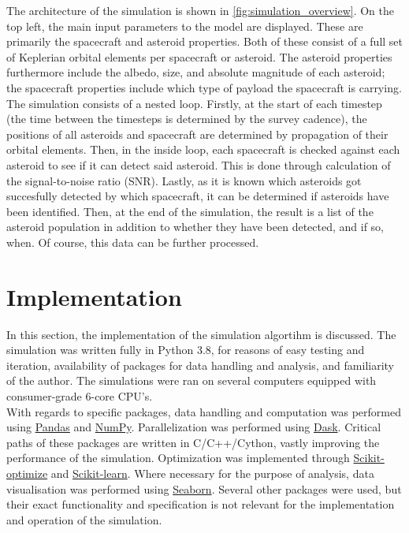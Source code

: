 The architecture of the simulation is shown in \autoref{fig:simulation_overview}. On the top left, the main input parameters to the model are displayed. These are primarily the spacecraft and asteroid properties. Both of these consist of a full set of Keplerian orbital elements per spacecraft or asteroid. The asteroid properties furthermore include the albedo, size, and absolute magnitude of each asteroid; the spacecraft properties include which type of payload the spacecraft is carrying. \\

The simulation consists of a nested loop. Firstly, at the start of each timestep (the time between the timesteps is determined by the survey cadence), the positions of all asteroids and spacecraft are determined by propagation of their orbital elements. Then, in the inside loop, each spacecraft is checked against each asteroid to see if it can detect said asteroid. This is done through calculation of the signal-to-noise ratio (SNR). Lastly, as it is known which asteroids got succesfully detected by which spacecraft, it can be determined if asteroids have been identified. Then, at the end of the simulation, the result is a list of the asteroid population in addition to whether they have been detected, and if so, when. Of course, this data can be further processed.

\section{Implementation}
\label{sec:methodologyimplementation}
In this section, the implementation of the simulation algortihm is discussed. The simulation was written fully in Python 3.8, for reasons of easy testing and iteration, availability of packages for data handling and analysis, and familiarity of the author. The simulations were ran on several computers equipped with consumer-grade 6-core CPU's. \\

With regards to specific packages, data handling and computation was performed using \href{https://pandas.pydata.org}{Pandas} and \href{https://numpy.org}{NumPy}. Parallelization was performed using \href{https://dask.org}{Dask}. Critical paths of these packages are written in C/C++/Cython, vastly improving the performance of the simulation. Optimization was implemented through \href{https://pypi.org/project/scikit-optimize}{Scikit-optimize} and \href{https://scikit-learn.org/stable/index.html}{Scikit-learn}. Where necessary for the purpose of analysis, data visualisation was performed using \href{https://seaborn.pydata.org}{Seaborn}. Several other packages were used, but their exact functionality and specification is not relevant for the implementation and operation of the simulation.


